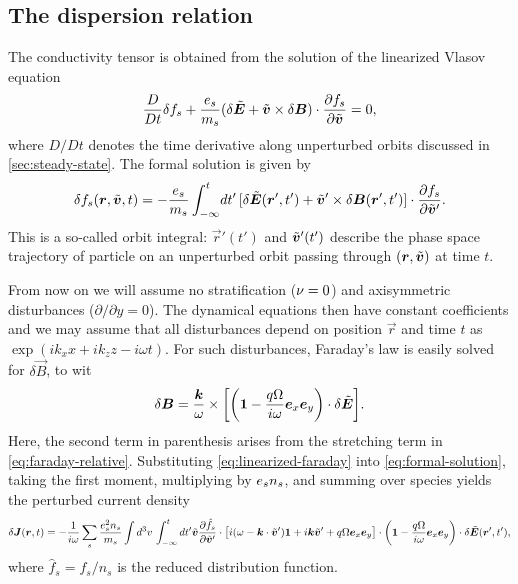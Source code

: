 \documentclass[aps,pre,notitlepage,amsmath,amssymb,amsfonts,nobibnotes,nofootinbib]{revtex4-1}
\begin{document}
\subsection{The dispersion relation}
\label{sec:conductivity-tensor}

The conductivity tensor is obtained from the solution of the linearized Vlasov
equation
\begin{equation}
  \label{eq:linear-vlasov-sheet}
  \frac{D}{Dt}\delta f_s
  + \frac{\qs}{m_s}(\delta\tvec{E} + \tvec{v}\times\delta\vec{B})
  \cdot\pder{f_s}{\tvec{v}} = 0,
\end{equation}
where $D/Dt$ denotes the time derivative along unperturbed orbits discussed in
\cref{sec:steady-state}. The formal solution is given by
\begin{equation}
  \label{eq:formal-solution}
  \delta f_s(\vec{r},\tvec{v},t) = -\frac{\qs}{m_s}\int_{-\infty}^t\!dt'\,
  [\delta\tvec{E}(\vec{r}',t') + \tvec{v}'\times\delta\vec{B}(\vec{r}',t')]
  \cdot\pder{f_s}{\tvec{v}'}.
\end{equation}
This is a so-called orbit integral: $\vec{r}'(t')$ and $\tilde{\bm{v}}'(t')$
describe the phase space trajectory of particle on an unperturbed orbit
passing through $(\bm{r},\tilde{\bm{v}})$ at time $t$.

From now on we will assume no stratification ($\nu=0$) and axisymmetric
disturbances ($\partial/\partial{}y=0$). The dynamical equations then have
constant coefficients and we may assume that all disturbances depend on
position $\vec{r}$ and time $t$ as $\exp(ik_x{}x+ik_z{}z-i\omega{}t)$. For
such disturbances, Faraday's law  is easily
solved for $\delta\vec{B}$, to wit
\begin{equation}
  \label{eq:linearized-faraday}
  \delta\vec{B} = \frac{\vec{k}}{\omega}\times\left[
    \left(\mathbf{1} - \frac{q\Omega}{i\omega}\ex\ey\right)
    \cdot\delta\tilde{\vec{E}}
  \right].
\end{equation}
Here, the second term in parenthesis arises from the stretching term in
\cref{eq:faraday-relative}. Substituting \cref{eq:linearized-faraday} into
\cref{eq:formal-solution}, taking the first moment, multiplying by $e_s{}n_s$,
and summing over species yields the perturbed current density
\begin{equation}
  \label{eq:perturbed-current}
  \delta\vec{J}(\vec{r},t)
  = -\frac{1}{i\omega}\sums\frac{\qs^2n_s}{m_s}
  \int d^3v\,\int_{-\infty}^t dt'
  \tvec{v}\pder{\hat{f}_s}{\tvec{v}'}\cdot\big[
  i(\omega - \vec{k}\cdot\tvec{v}')\mathbf{1}
  + i\vec{k}\tvec{v}' + q\Omega\ex\ey
  \big]\cdot\left(\mathbf{1} - \frac{q\Omega}{i\omega}\ex\ey\right)
  \cdot\delta\tvec{E}(\vec{r}',t'),
\end{equation}
where $\hat{f}_s=f_s/n_s$ is the reduced distribution function.
\end{document}
